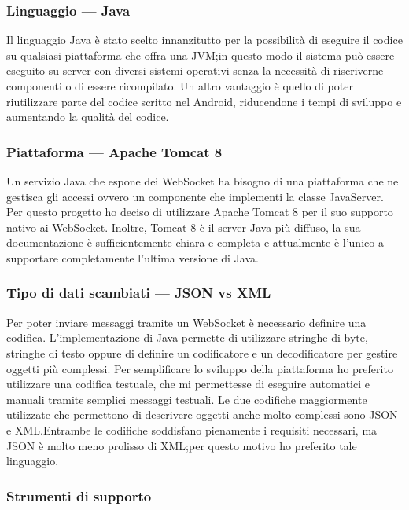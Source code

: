 	\subsubsection{Linguaggio --- Java}
	Il linguaggio Java è stato scelto innanzitutto per la possibilità di eseguire il codice su qualsiasi piattaforma che offra una \gls{JVM};\@ in questo modo il sistema può essere eseguito su server con diversi sistemi operativi senza la necessità di riscriverne componenti o di essere ricompilato. Un altro vantaggio è quello di poter riutilizzare parte del codice scritto nel  Android, riducendone i tempi di sviluppo e aumentando la qualità del codice.

	\subsubsection{Piattaforma --- Apache Tomcat 8}
	Un servizio Java che espone dei WebSocket ha bisogno di una piattaforma che ne gestisca gli accessi ovvero un componente che implementi la classe JavaServer. Per questo progetto ho deciso di utilizzare Apache Tomcat 8 per il suo supporto nativo ai WebSocket. Inoltre, Tomcat 8 è il server Java  più diffuso, la sua documentazione è sufficientemente chiara e completa e attualmente è l'unico a supportare completamente l'ultima versione di Java.

	\subsubsection{Tipo di dati scambiati --- \gls{JSON} vs \gls{XML}}
	Per poter inviare messaggi tramite un WebSocket è necessario definire una codifica. L'implementazione  di Java permette di utilizzare stringhe di byte, stringhe di testo oppure di definire un codificatore e un decodificatore per gestire oggetti più complessi. Per semplificare lo sviluppo della piattaforma ho preferito utilizzare una codifica testuale, che mi permettesse di eseguire  automatici e manuali tramite semplici messaggi testuali. Le due codifiche maggiormente utilizzate che permettono di descrivere oggetti anche molto complessi sono \gls{JSON} e \gls{XML}.\@ Entrambe le codifiche soddisfano pienamente i requisiti necessari, ma \gls{JSON} è molto meno prolisso di \gls{XML};\@ per questo motivo ho preferito tale linguaggio.

	\subsubsection{Strumenti di supporto}
